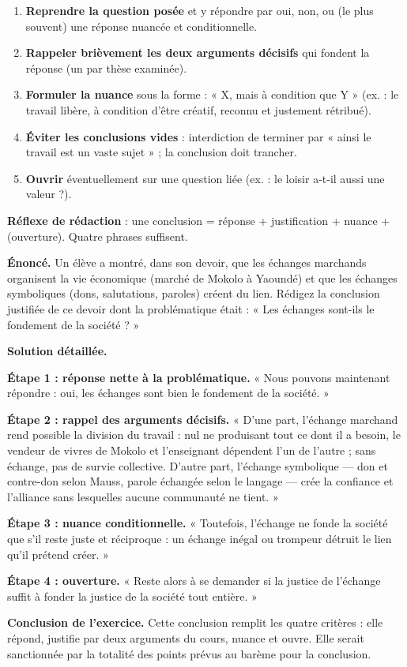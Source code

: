 \documentclass[11pt]{article}
\begin{document}
\begin{methode}
\begin{enumerate}
\item \textbf{Reprendre la question posée} et y répondre par oui, non, ou (le plus souvent) une réponse nuancée et conditionnelle.
\item \textbf{Rappeler brièvement les deux arguments décisifs} qui fondent la réponse (un par thèse examinée).
\item \textbf{Formuler la nuance} sous la forme : « X, mais à condition que Y » (ex. : le travail libère, à condition d'être créatif, reconnu et justement rétribué).
\item \textbf{Éviter les conclusions vides} : interdiction de terminer par « ainsi le travail est un vaste sujet » ; la conclusion doit trancher.
\item \textbf{Ouvrir} éventuellement sur une question liée (ex. : le loisir a-t-il aussi une valeur ?).
\end{enumerate}
\textbf{Réflexe de rédaction} : une conclusion = réponse + justification + nuance + (ouverture). Quatre phrases suffisent.
\end{methode}

\begin{exoresolu}
\textbf{Énoncé.} Un élève a montré, dans son devoir, que les échanges marchands organisent la vie économique (marché de Mokolo à Yaoundé) et que les échanges symboliques (dons, salutations, paroles) créent du lien. Rédigez la conclusion justifiée de ce devoir dont la problématique était : « Les échanges sont-ils le fondement de la société ? »

\tcblower
\textbf{Solution détaillée.}

\textbf{Étape 1 : réponse nette à la problématique.} « Nous pouvons maintenant répondre : oui, les échanges sont bien le fondement de la société. »

\textbf{Étape 2 : rappel des arguments décisifs.} « D'une part, l'échange marchand rend possible la division du travail : nul ne produisant tout ce dont il a besoin, le vendeur de vivres de Mokolo et l'enseignant dépendent l'un de l'autre ; sans échange, pas de survie collective. D'autre part, l'échange symbolique — don et contre-don selon Mauss, parole échangée selon le langage — crée la confiance et l'alliance sans lesquelles aucune communauté ne tient. »

\textbf{Étape 3 : nuance conditionnelle.} « Toutefois, l'échange ne fonde la société que s'il reste juste et réciproque : un échange inégal ou trompeur détruit le lien qu'il prétend créer. »

\textbf{Étape 4 : ouverture.} « Reste alors à se demander si la justice de l'échange suffit à fonder la justice de la société tout entière. »

\textbf{Conclusion de l'exercice.} Cette conclusion remplit les quatre critères : elle répond, justifie par deux arguments du cours, nuance et ouvre. Elle serait sanctionnée par la totalité des points prévus au barème pour la conclusion.
\end{exoresolu}
\end{document}
